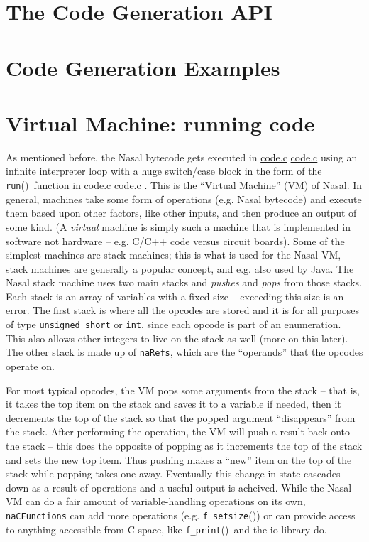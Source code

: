 \documentclass{article}
\newcommand{\todo}[1]{}
\newcommand{\type}[1]{\textcolor{type}{\tt #1}}
\newcommand{\func}[1]{\textcolor{func}{\tt #1}}
\newcommand{\nasalsourcefile}[2][]{%
  \ifthenelse{\isempty{#1}}%
    {%
      \textcolor{source}{%
        \href{https://github.com/andyross/nasal/blob/master/src/#2}{#2}%
      }%
    }%
    {%
      \textcolor{source}{%
        \href{https://github.com/andyross/nasal/blob/master/src/#2\#L#1}{#2}%
      }%
    }%
}
\newcommand{\fp}{\textcolor{func}{()}}
\begin{document}
\section{The Code Generation API}
\todo{document the codegen.c APIs?}

\section{Code Generation Examples}
\todo{discuss loops, function calls, methods?}

\section{Virtual Machine: running code}
As mentioned before, the Nasal bytecode gets executed in \nasalsourcefile{code.c} using an infinite interpreter loop with a huge switch/case block in the form of the \func{run}\fp\ function in \nasalsourcefile{code.c}.  This is the ``Virtual Machine'' (VM) of Nasal.  In general, machines take some form of operations (e.g. Nasal bytecode) and execute them based upon other factors, like other inputs, and then produce an output of some kind.  (A \emph{virtual} machine is simply such a machine that is implemented in software not hardware -- e.g. C/C++ code versus circuit boards).  Some of the simplest machines are stack machines; this is what is used for the Nasal VM, stack machines are generally a popular concept, and e.g. also used by Java.  The Nasal stack machine uses two main stacks and \emph{pushes} and \emph{pops} from those stacks.  Each stack is an array of variables with a fixed size -- exceeding this size is an error.  The first stack is where all the opcodes are stored and it is for all purposes of type \type{unsigned short} or \type{int}, since each opcode is part of an enumeration.  This also allows other integers to live on the stack as well (more on this later).  The other stack is made up of \type{naRefs}, which are the ``operands'' that the opcodes operate on.

For most typical opcodes, the VM pops some arguments from the stack -- that is, it takes the top item on the stack and saves it to a variable if needed, then it decrements the top of the stack so that the popped argument ``disappears'' from the stack.  After performing the operation, the VM will push a result back onto the stack -- this does the opposite of popping as it increments the top of the stack and sets the new top item.  Thus pushing makes a ``new'' item on the top of the stack while popping takes one away.  Eventually this change in state cascades down as a result of operations and a useful output is acheived.  While the Nasal VM can do a fair amount of variable-handling operations on its own, \type{naCFunctions} can add more operations (e.g. \func{f\_setsize}\fp) or can provide access to anything accessible from C space, like \func{f\_print}\fp\ and the io library do.
\end{document}
